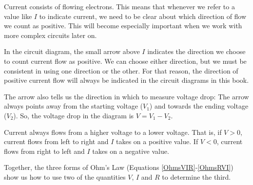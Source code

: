 \begin{kaobox}[frametitle=Signs of things to come \dots]
Current consists of flowing electrons.
This means that whenever we refer to a value like $I$ to indicate current, we need to be clear about which direction of flow we count as positive.
This will become especially important when we work with more complex circuits later on.

In the circuit diagram, the small arrow above $I$ indicates the direction we choose to count current flow as positive.
We can choose either direction, but we must be consistent in using one direction or the other.
For that reason, the direction of positive current flow will always be indicated in the circuit diagrams in this book.


The arrow also tells us the direction in which to measure voltage drop:
The arrow always points away from the starting voltage ($V_1$) and towards the ending voltage ($V_2$).
So, the voltage drop in the diagram is $V=V_1-V_2$.

Current always flows from a higher voltage to a lower voltage.
That is, if $V>0$, current flows from left to right and $I$ takes on a positive value.
If $V<0$, current flows from right to left and $I$ takes on a negative value.
\end{kaobox}


Together, the three forms of Ohm's Law (Equations \ref{OhmsVIR}-\ref{OhmsRVI}) show us how to use two of the quantities $V$, $I$ and $R$ to determine the third.

